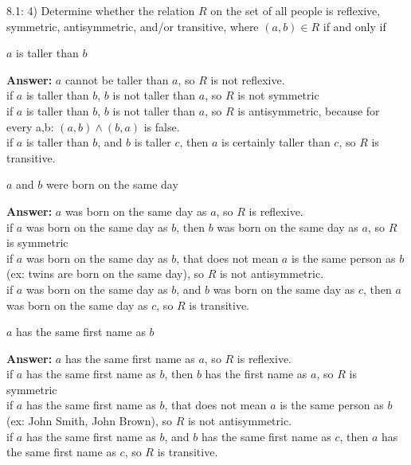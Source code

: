\documentclass{article}
\newenvironment{answer}
{\color{PineGreen}\begin{list}{}%
         {\setlength{\leftmargin}{1cm}}%
         \item[]%
        \textbf{Answer: }}
{\end{list}}
\begin{document}
8.1: 4) Determine whether the relation $R$ on the set of all people is reflexive, symmetric, antisymmetric, and/or transitive, where $(a,b) \in R$ if and only if

\begin{enumerate}[label=\alph{enumi})]
\item $a$ is taller than $b$
\begin{answer}
$a$ cannot be taller than $a$, so $R$ is not reflexive.\\
if $a$ is taller than $b$, $b$ is not taller than $a$, so $R$ is not symmetric\\
if $a$ is taller than $b$, $b$ is not taller than $a$, so $R$ is antisymmetric, because for every a,b: $(a,b) \wedge (b,a)$ is false.\\
if $a$ is taller than $b$, and $b$ is taller $c$, then $a$ is certainly taller than $c$, so $R$ is transitive.\\
\end{answer}
\item $a$ and $b$ were born on the same day
\begin{answer}
$a$ was born on the same day as $a$, so $R$ is reflexive.\\
if $a$ was born on the same day as $b$, then $b$ was born on the same day as $a$, so $R$ is symmetric\\
if $a$ was born on the same day as $b$, that does not mean $a$ is the same person as $b$ (ex: twins are born on the same day), so $R$ is not antisymmetric.\\
if $a$ was born on the same day as $b$, and $b$ was born on the same day as $c$, then $a$ was born on the same day as $c$, so $R$ is transitive.\\
\end{answer}
\item $a$ has the same first name as $b$
\begin{answer}
$a$ has the same first name as $a$, so $R$ is reflexive.\\
if $a$ has the same first name as $b$, then $b$ has the first name as $a$, so $R$ is symmetric\\
if $a$ has the same first name as $b$, that does not mean $a$ is the same person as $b$ (ex: John Smith, John Brown), so $R$ is not antisymmetric.\\
if $a$ has the same first name as $b$, and $b$ has the same first name as $c$, then $a$ has the same first name as $c$, so $R$ is transitive.\\
\end{answer}

\end{enumerate}
\end{document}
